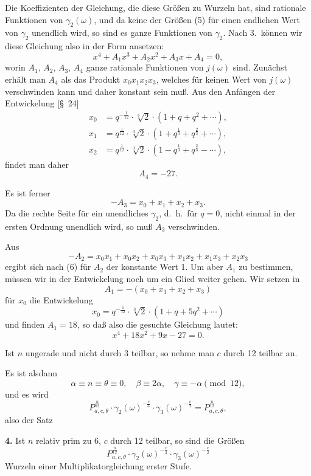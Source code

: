 \documentclass[12pt,a4paper]{article}
\theoremstyle{definition}
\begin{document}
Die Koeffizienten der Gleichung, die diese Größen zu Wurzeln hat, sind rationale Funktionen von $\gamma_2(\omega)$, und da keine der Größen (5) für einen endlichen Wert von $\gamma_2$ unendlich wird, so sind es ganze Funktionen von $\gamma_2$. Nach 3.\ können wir diese Gleichung also in der Form ansetzen:
\[
x^4 + A_1 x^3 + A_2 x^2 + A_3 x + A_4 = 0,
\]
worin $A_1$, $A_2$, $A_3$, $A_4$ ganze rationale Funktionen von $j(\omega)$ sind. Zunächst erhält man $A_4$ als das Produkt $x_0 x_1 x_2 x_3$, welches für keinen Wert von $j(\omega)$ verschwinden kann und daher konstant sein muß. Aus den Anfängen der Entwickelung [\S\ 24]
\[
\begin{aligned}
x_0 &= q^{-\frac{1}{12}} \cdot \sqrt[3]{2} \cdot (1 + q + q^2 + \cdots), \\
x_1 &= q^{\frac{1}{12}} \cdot \sqrt[3]{2} \cdot (1 + q^{\frac{1}{3}} + q^{\frac{2}{3}} + \cdots), \\
x_2 &= q^{\frac{1}{12}} \cdot \sqrt[3]{2} \cdot (1 - q^{\frac{1}{3}} + q^{\frac{2}{3}} - \cdots),
\end{aligned}
\]
findet man daher
\[
A_4 = -27.
\]

Es ist ferner
\[
-A_3 = x_0 + x_1 + x_2 + x_3.
\]
Da die rechte Seite für ein unendliches $\gamma_2$, d.~h.\ für $q = 0$, nicht einmal in der ersten Ordnung unendlich wird, so muß $A_3$ verschwinden.

Aus
\[
-A_2 = x_0 x_1 + x_0 x_2 + x_0 x_3 + x_1 x_2 + x_1 x_3 + x_2 x_3
\]
ergibt sich nach (6) für $A_2$ der konstante Wert 1. Um aber $A_1$ zu bestimmen, müssen wir in der Entwickelung noch um ein Glied weiter gehen. Wir setzen in
\[
A_1 = -(x_0 + x_1 + x_2 + x_3)
\]
für $x_0$ die Entwickelung
\[
x_0 = q^{-\frac{1}{12}} \cdot \sqrt[3]{2} \cdot (1 + q + 5q^2 + \cdots)
\]
und finden $A_1 = 18$, so daß also die gesuchte Gleichung lautet:
\begin{equation}\label{eq:72-7}
x^4 + 18x^2 + 9x - 27 = 0.
\end{equation}

Ist $n$ ungerade und nicht durch 3 teilbar, so nehme man $c$ durch 12 teilbar an.

Es ist alsdann
\[
\alpha \equiv n \equiv \theta \equiv 0, \quad \beta \equiv 2\alpha, \quad \gamma \equiv -\alpha \pmod{12},
\]
und es wird
\[
P_{a,c,\theta}^{\frac{n}{12}} \cdot \gamma_2(\omega)^{-\frac{c}{3}} \cdot \gamma_3(\omega)^{-\frac{c}{2}} = P_{a,c,\theta}^{\frac{n}{12}},
\]
also der Satz

\textbf{4.} Ist $n$ relativ prim zu 6, $c$ durch 12 teilbar, so sind die Größen
\[
P_{a,c,\theta}^{\frac{n}{12}} \cdot \gamma_2(\omega)^{-\frac{c}{3}} \cdot \gamma_3(\omega)^{-\frac{c}{2}}
\]
Wurzeln einer Multiplikatorgleichung erster Stufe.
\end{document}
